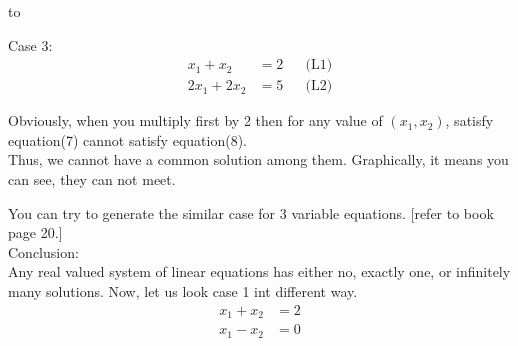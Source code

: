 to\documentclass{article}
\begin{document}

Case 3:\\

\begin{align}
    x_1 + x_2 &= 2 &&  \text{(L1)}\\
    2x_1 + 2x_2 &= 5  &&  \text{(L2)}
\end{align}

Obviously, when you multiply first by 2 then for any value of \((x_1, x_2)\), satisfy equation(7) cannot satisfy equation(8).\\

Thus, we cannot have a common solution among them. Graphically, it means you can see, they can not meet.\\


You can try to generate the similar case for 3 variable equations. [refer to book page 20.]\\

Conclusion:\\

Any real valued system of linear equations has either no, exactly one, or infinitely many solutions. Now, let us look case 1 int different way.\\
\begin{align}
    x_1 + x_2 &= 2 \nonumber\\
    x_1 - x_2 &= 0 \nonumber
\end{align}
\end{document}
